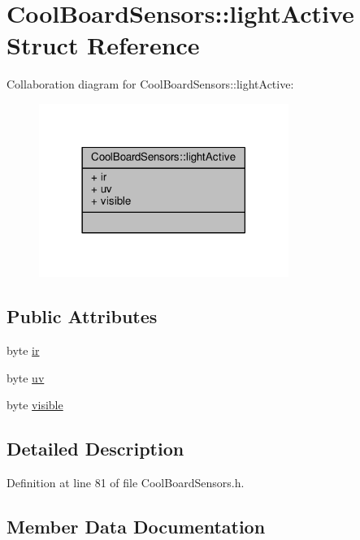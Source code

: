 \hypertarget{structCoolBoardSensors_1_1lightActive}{}\section{Cool\+Board\+Sensors\+:\+:light\+Active Struct Reference}
\label{structCoolBoardSensors_1_1lightActive}


Collaboration diagram for Cool\+Board\+Sensors\+:\+:light\+Active\+:
\nopagebreak
\begin{figure}[H]
\begin{center}
\leavevmode
\includegraphics[width=230pt]{structCoolBoardSensors_1_1lightActive__coll__graph}
\end{center}
\end{figure}
\subsection*{Public Attributes}
\begin{DoxyCompactItemize}
\item 
byte \hyperlink{structCoolBoardSensors_1_1lightActive_a67700895349b95ceb263f1a6da756315}{ir}
\item 
byte \hyperlink{structCoolBoardSensors_1_1lightActive_a949a7aaf5166d981de8fe0fd93da20d6}{uv}
\item 
byte \hyperlink{structCoolBoardSensors_1_1lightActive_abcbba296b6a95e67c0cd2555d9dd50c7}{visible}
\end{DoxyCompactItemize}


\subsection{Detailed Description}


Definition at line 81 of file Cool\+Board\+Sensors.\+h.



\subsection{Member Data Documentation}
\mbox{\label{structCoolBoardSensors_1_1lightActive_a67700895349b95ceb263f1a6da756315}} 
